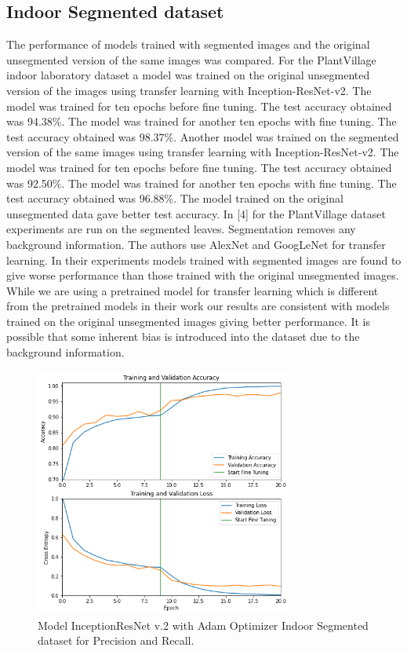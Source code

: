 \documentclass[conference]{IEEEtran}
\begin{document}
\subsection{Indoor Segmented dataset}
The performance of models trained with segmented images and the original unsegmented version of the same images was compared. For the PlantVillage indoor laboratory dataset a model was trained on the original unsegmented version of the images using transfer learning with Inception-ResNet-v2. The model was trained for ten epochs before fine tuning. The test accuracy obtained was 94.38\%. The model was trained for another ten epochs with fine tuning. The test accuracy obtained was 98.37\%. Another model was trained on the segmented version of the same images using transfer learning with Inception-ResNet-v2. The model was trained for ten epochs before fine tuning. The test accuracy obtained was 92.50\%. The model was trained for another ten epochs with fine tuning. The test accuracy obtained was 96.88\%. The model trained on the original unsegmented data gave better test accuracy. In [4] for the PlantVillage dataset experiments are run on the segmented leaves. Segmentation removes any background information. The authors use AlexNet and GoogLeNet for transfer learning. In their experiments models trained with segmented images are found to give worse performance than those trained with the original unsegmented images. While we are using a pretrained model for transfer learning which is different from the pretrained models in their work our results are consistent with models trained on the original unsegmented images giving better performance. It is possible that some inherent bias is introduced into the dataset due to the background information.  \ 
\begin{figure}[htbp]
\centerline{\includegraphics[width=8.5cm]{ModelIndoorsResNetEpochsSegmentedAccuracychart.png}}
\caption{Model InceptionResNet v.2 with Adam Optimizer Indoor Segmented dataset for Precision and Recall.}
\label{fig}
\end{figure}
 
\end{document}
